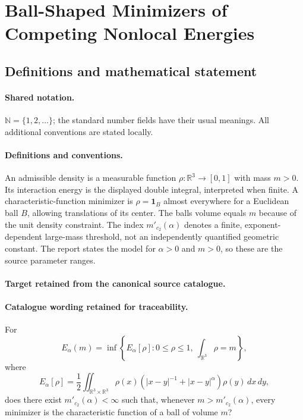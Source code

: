 \documentclass[11pt]{article}
\begin{document}
\section{Ball-Shaped Minimizers of Competing Nonlocal Energies}\label{statement}

\subsection{Definitions and mathematical statement}

\paragraph{Shared notation.}$\mathbb N=\{1,2,\ldots\}$; the standard number fields have their usual meanings. All additional conventions are stated locally.


\paragraph{Definitions and conventions.}
An admissible density is a measurable function $\rho:\mathbb R^3\to[0,1]$ with mass $m>0$. Its interaction energy is the displayed double integral, interpreted when finite. A characteristic-function minimizer is $\rho=\mathbf1_B$ almost everywhere for a Euclidean ball $B$, allowing translations of its center. The ball\textquotesingle s volume equals $m$ because of the unit density constraint. The index $m'_{c_2}(\alpha)$ denotes a finite, exponent-dependent large-mass threshold, not an independently quantified geometric constant. The report states the model for $\alpha>0$ and $m>0$, so these are the source parameter ranges.

\paragraph{Target retained from the canonical source catalogue.}
\paragraph{Catalogue wording retained for traceability.}
For
$$
E_\alpha(m)=\inf\left\{E_\alpha[\rho]:0\leq\rho\leq1,\ \int_{\mathbb R^3}\rho=m\right\},
$$
where
$$
E_\alpha[\rho]=\frac12\iint_{\mathbb R^3\times\mathbb R^3}\rho(x)\left(|x-y|^{-1}+|x-y|^\alpha\right)\rho(y)\,dx\,dy,
$$
does there exist $m'_{c_2}(\alpha)<\infty$ such that, whenever $m>m'_{c_2}(\alpha)$, every minimizer is the characteristic function of a ball of volume $m$?
\end{document}
